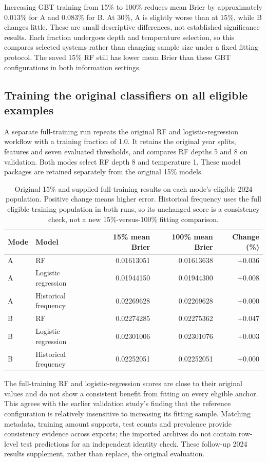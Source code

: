Increasing GBT training from 15\% to 100\% reduces mean Brier by approximately 0.013\% for A and 0.083\% for B. At 30\%, A is slightly worse than at 15\%, while B changes little. These are small descriptive differences, not established significance results. Each fraction undergoes depth and temperature selection, so this compares selected systems rather than changing sample size under a fixed fitting protocol. The saved 15\% RF still has lower mean Brier than these GBT configurations in both information settings.

\clearpage
\subsection{Training the original classifiers on all eligible examples}
A separate full-training run repeats the original RF and logistic-regression workflow with a training fraction of 1.0. It retains the original year splits, features and seven evaluated thresholds, and compares RF depths 5 and 8 on validation. Both modes select RF depth 8 and temperature 1. These model packages are retained separately from the original 15\% models.
\begin{table}[!ht]\centering\small
\begin{tabular}{llrrr}\toprule
Mode & Model & 15\% mean Brier & 100\% mean Brier & Change (\%)\\\midrule
A & RF & 0.01613051 & 0.01613638 & +0.036 \\
A & Logistic regression & 0.01944150 & 0.01944300 & +0.008 \\
A & Historical frequency & 0.02269628 & 0.02269628 & +0.000 \\
B & RF & 0.02274285 & 0.02275362 & +0.047 \\
B & Logistic regression & 0.02301006 & 0.02301076 & +0.003 \\
B & Historical frequency & 0.02252051 & 0.02252051 & +0.000 \\
\bottomrule\end{tabular}
\caption{Original 15\% and supplied full-training results on each mode's eligible 2024 population. Positive change means higher error. Historical frequency uses the full eligible training population in both runs, so its unchanged score is a consistency check, not a new 15\%-versus-100\% fitting comparison.}\label{tab:fulltraining}
\end{table}
\FloatBarrier

The full-training RF and logistic-regression scores are close to their original values and do not show a consistent benefit from fitting on every eligible anchor. This agrees with the earlier validation study's finding that the reference configuration is relatively insensitive to increasing its fitting sample. Matching metadata, training amount supports, test counts and prevalence provide consistency evidence across exports; the imported archives do not contain row-level test predictions for an independent identity check. These follow-up 2024 results supplement, rather than replace, the original evaluation.

